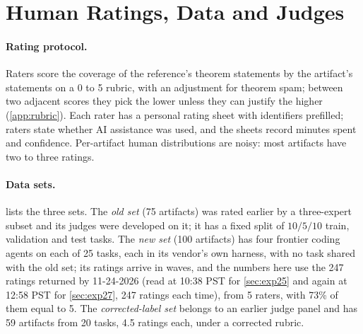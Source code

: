 \section{Human Ratings, Data and Judges}
\label{sec:data}
\paragraph{Rating protocol.}
Raters score the coverage of the reference's theorem statements by the artifact's statements on a 0 to 5 rubric, with an adjustment for theorem spam; between two adjacent scores they pick the lower unless they can justify the higher (\cref{app:rubric}).
Each rater has a personal rating sheet with identifiers prefilled; raters state whether AI assistance was used, and the sheets record minutes spent and confidence.
Per-artifact human distributions are noisy: most artifacts have two to three ratings.

\paragraph{Data sets.}
 lists the three sets.
The \emph{old set} (75 artifacts) was rated earlier by a three-expert subset and its judges were developed on it; it has a fixed split of $10/5/10$ train, validation and test tasks.
The \emph{new set} (100 artifacts) has four frontier coding agents on each of 25 tasks, each in its vendor's own harness, with no task shared with the old set; its ratings arrive in waves, and the numbers here use the 247 ratings returned by 11-24-2026 (read at 10:38 PST for \cref{sec:exp25} and again at 12:58 PST for \cref{sec:exp27}, 247 ratings each time), from 5 raters, with 73\% of them equal to 5.
The \emph{corrected-label set} belongs to an earlier judge panel and has 59 artifacts from 20 tasks, 4.5 ratings each, under a corrected rubric.

\begin{table}[t]
\caption{Data sets. Ratings of the new set are a first wave (247 of 3{,}300 sheet rows returned).}
\label{tab:data}
\centering\small
{}
\end{table}

